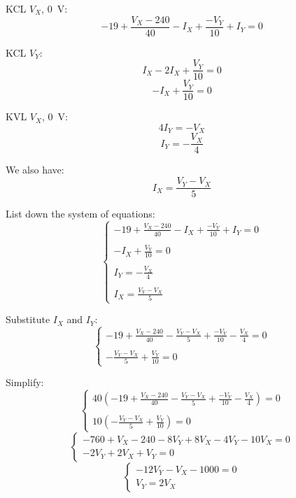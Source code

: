 \documentclass{article}
\begin{document}
				KCL $V_X$, \qty{0}{\volt}:
					\[-19 + \frac{V_X - 240}{40} - I_X + \frac{-V_Y}{10} + I_Y = 0\]

				KCL $V_Y$:
					\[I_X - 2I_X + \frac{V_Y}{10} = 0\]
					\[-I_X + \frac{V_Y}{10} = 0\]

				KVL $V_X$, \qty{0}{\volt}:
					\[4I_Y = -V_X\]
					\[I_Y = -\frac{V_X}{4}\]

				We also have:
					\[I_X = \frac{V_Y - V_X}{5}\]

				List down the system of equations:
					\begin{equation*}\begin{cases}
						\displaystyle -19 + \frac{V_X - 240}{40} - I_X + \frac{-V_Y}{10} + I_Y = 0 \\ \\
						\displaystyle -I_X + \frac{V_Y}{10} = 0 \\ \\
						\displaystyle I_Y = -\frac{V_X}{4} \\ \\
						\displaystyle I_X = \frac{V_Y - V_X}{5}
					\end{cases}\end{equation*}

				Substitute $I_X$ and $I_Y$:
					\begin{equation*}\begin{cases}
						\displaystyle -19 + \frac{V_X - 240}{40} - \frac{V_Y - V_X}{5} + \frac{-V_Y}{10} - \frac{V_X}{4} = 0 \\ \\
						\displaystyle -\frac{V_Y - V_X}{5} + \frac{V_Y}{10} = 0
					\end{cases}\end{equation*}

				Simplify:
					\begin{equation*}\begin{cases}
						\displaystyle 40\left(-19 + \frac{V_X - 240}{40} - \frac{V_Y - V_X}{5} + \frac{-V_Y}{10} - \frac{V_X}{4}\right) = 0 \\ \\
						\displaystyle 10\left(-\frac{V_Y - V_X}{5} + \frac{V_Y}{10}\right) = 0
					\end{cases}\end{equation*}
					\begin{equation*}\begin{cases}
						\displaystyle -760 + V_X - 240 - 8V_Y + 8V_X - 4V_Y - 10V_X = 0 \\
						\displaystyle -2V_Y + 2V_X + V_Y = 0
					\end{cases}\end{equation*}
					\begin{equation*}\begin{cases}
						\displaystyle -12V_Y - V_X - 1000 = 0\\
						\displaystyle V_Y = 2V_X
					\end{cases}\end{equation*}
\end{document}
